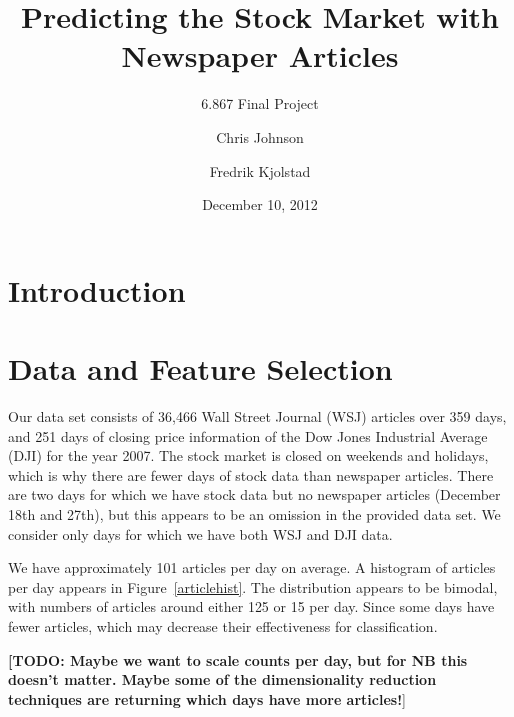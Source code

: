\documentclass[10pt]{scrartcl}
\def\TODO#1{\noindent\textbf{[TODO: #1}]}
\begin{document}
\title{Predicting the Stock Market with Newspaper Articles}
\subtitle{6.867 Final Project}
\author{Chris Johnson \and Fredrik Kjolstad}
\date{December 10, 2012}
\maketitle

\begin{abstract}

\end{abstract}

\section{Introduction}

\section{Data and Feature Selection}

Our data set consists of 36,466 Wall Street Journal (WSJ) articles over 359 days, and 251 days of closing price information of the Dow Jones Industrial Average (DJI) for the year 2007. The stock market is closed on weekends and holidays, which is why there are fewer days of stock data than newspaper articles. There are two days for which we have stock data but no newspaper articles (December 18th and 27th), but this appears to be an omission in the provided data set. We consider only days for which we have both WSJ and DJI data. 

We have approximately 101 articles per day on average. A histogram of articles per day appears in Figure~\ref{articlehist}. The distribution appears to be bimodal, with numbers of articles around either 125 or 15 per day. Since some days have fewer articles, which may decrease their effectiveness for classification. 

\TODO{Maybe we want to scale counts per day, but for NB this doesn't matter. Maybe some of the dimensionality reduction techniques are returning which days have more articles!}
\end{document}
